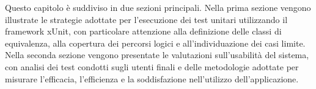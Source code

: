 

Questo capitolo è suddiviso in due sezioni principali. Nella prima sezione vengono illustrate le strategie adottate per l’esecuzione dei test unitari utilizzando il framework xUnit, con particolare attenzione alla definizione delle classi di equivalenza, alla copertura dei percorsi logici e all’individuazione dei casi limite. Nella seconda sezione vengono presentate le valutazioni sull’usabilità del sistema, con analisi dei test condotti sugli utenti finali e delle metodologie adottate per misurare l’efficacia, l’efficienza e la soddisfazione nell’utilizzo dell’applicazione.


